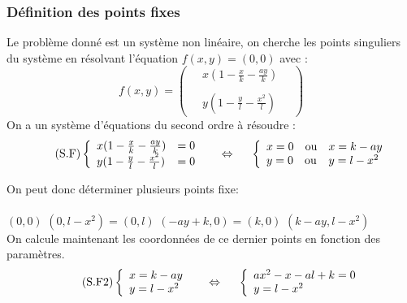\documentclass{article}
\begin{document}
\subsubsection{Définition des points fixes}
Le problème donné est un système non linéaire, on cherche les points singuliers du système en résolvant l'équation $f(x,y) = (0,0) $ avec :
\begin{equation*}
    f(x,y) = 
    \begin{pmatrix}
        \quad x(1 - \frac{x}{k} - \frac{a y}{k})\phantom{\quad}\\\\
        \quad y(1- \frac{y}{l} - \frac{x^{2}}{l})\phantom{\quad}
    \end{pmatrix}
\end{equation*}
On a un système d'équations du second ordre à résoudre :\\
\begin{equation}
\label{eq:f1}
\tag{S.F}
\left\{
    \begin{array}{ll}
        x(1 - \frac{x}{k} - \frac{a y}{k}) & = 0 \\
        y(1- \frac{y}{l} - \frac{x^{2}}{l}) & = 0
    \end{array}
\right.
\hspace{0.5cm}
\Leftrightarrow
\hspace{0.5cm}
\left\{
    \begin{array}{ll}
        x = 0 \quad \text{ou} & x = k - a y \\
        y = 0 \quad \text{ou} & y = l - x^2
    \end{array}
\right.
\end{equation}

On peut donc déterminer plusieurs points fixe:\\\\
\phantom{}\hfill $(0,0)$ \hfill $(0,l - x^2) = (0,l)$ \hfill $(- a y + k,0) = (k,0)$ \hfill $(k - a y, l - x^{2})$ \hfill \phantom{}\\

On calcule maintenant les coordonnées de ce dernier points en fonction des paramètres.\\
\begin{equation}
\label{eq:f2}
\tag{S.F2}
\left\{
    \begin{array}{l}
        x = k - ay \\
        y = l - x^{2}
    \end{array}
\right.
\hspace{0.5cm}
\Leftrightarrow
\hspace{0.5cm}
\left\{
    \begin{array}{l}
        ax^{2} - x - al + k = 0\\
        y = l - x^{2}
    \end{array}
\right.
\end{equation}\\
\end{document}
